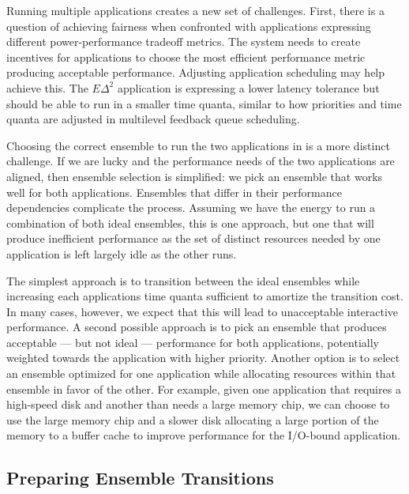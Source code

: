 Running multiple applications creates a new set of challenges. First, there
is a question of achieving fairness when confronted with applications
expressing different power-performance tradeoff metrics. The system needs to
create incentives for applications to choose the most efficient performance
metric producing acceptable performance. Adjusting application scheduling may
help achieve this. The $E\Delta^2$ application is expressing a lower latency
tolerance but should be able to run in a smaller time quanta, similar to how
priorities and time quanta are adjusted in multilevel feedback queue
scheduling.

Choosing the correct ensemble to run the two applications in is a more
distinct challenge. If we are lucky and the performance needs of the two
applications are aligned, then ensemble selection is simplified: we pick an
ensemble that works well for both applications. Ensembles that differ in
their performance dependencies complicate the process. Assuming we have the
energy to run a combination of both ideal ensembles, this is one approach,
but one that will produce inefficient performance as the set of distinct
resources needed by one application is left largely idle as the other runs.

The simplest approach is to transition between the ideal ensembles while
increasing each applications time quanta sufficient to amortize the
transition cost. In many cases, however, we expect that this will lead to
unacceptable interactive performance. A second possible approach is to pick
an ensemble that produces acceptable --- but not ideal --- performance for
both applications, potentially weighted towards the application with higher
priority. Another option is to select an ensemble optimized for one
application while allocating resources within that ensemble in favor of the
other. For example, given one application that requires a high-speed disk and
another than needs a large memory chip, we can choose to use the large memory
chip and a slower disk allocating a large portion of the memory to a buffer
cache to improve performance for the I/O-bound application.

\subsection{Preparing Ensemble Transitions}
